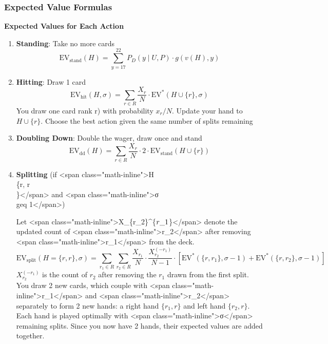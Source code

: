 \documentclass[12pt,a4paper]{cibb}
\begin{document}
\subsubsection*{Expected Value Formulas}

\textbf{Expected Values for Each Action}

\begin{enumerate}
    \item \textbf{Standing}: Take no more cards
    \begin{equation}
        \mathrm{EV}_{\text{stand}}(H) = \sum_{y=17}^{22} P_D(y \mid U, P) \cdot g(v(H), y)
        \label{eq:EV_STAND}
    \end{equation}

    \item \textbf{Hitting}: Draw 1 card
    \begin{equation}
          \mathrm{EV}_{\text{hit}}(H, σ  ) = \sum_{r \in R} \frac{X_r}{N} \cdot \mathrm{EV}^*(H \cup \{r\}, σ  )
        \label{eq:EV_HIT}
    \end{equation}
You draw one card rank r) with probability \(x_r/N\).
Update your hand to \(H \cup \{r\}\). Choose the best action given the same number of splits remaining

    \item \textbf{Doubling Down}: Double the wager, draw once and stand
    \begin{equation}
        \mathrm{EV}_{\text{dd}}(H) = \sum_{r \in R} \frac{X_r}{N} \cdot 2 \cdot \mathrm{EV}_{\text{stand}}(H \cup \{r\})
        \label{eq:EV_DOUBLE}
    \end{equation}

    \item \textbf{Splitting} (if <span class="math-inline">H \= \\\{r, r\\\}</span> and <span class="math-inline">σ \\geq 1</span>)

    Let <span class="math-inline">X\_\{r\_2\}^\{\(\-r\_1\)\}</span> denote the updated count of <span class="math-inline">r\_2</span> after removing <span class="math-inline">r\_1</span> from the deck. 
    \begin{equation}
        \mathrm{EV}_{\text{split}}(H = \{r, r\}, σ  ) = \sum_{r_1 \in R} \sum_{r_2 \in R} \frac{X_{r_1}}{N} \cdot \frac{X_{r_2}^{(-r_1)}}{N - 1} \cdot \left[ \mathrm{EV}^*(\{r, r_1\}, σ   - 1) + \mathrm{EV}^*(\{r, r_2\}, σ   - 1) \right]
        \label{eq:EV_SPLIT}
    \end{equation}
\({X_{r_2}^{(-r_1)}}\) is the count of \(r_2\) after removing the \(r_1\) drawn from the first split.
You draw 2 new cards, which couple with <span class="math-inline">r\_1</span> and <span class="math-inline">r\_2</span> separately to form 2 new hands: a right hand \( \{r_1, r\}\) and left hand \( \{r_2, r\}\).
Each hand is played optimally with <span class="math-inline">σ</span> remaining splits. Since you now have 2 hands, their expected values are added together.
\end{enumerate}
\end{document}
